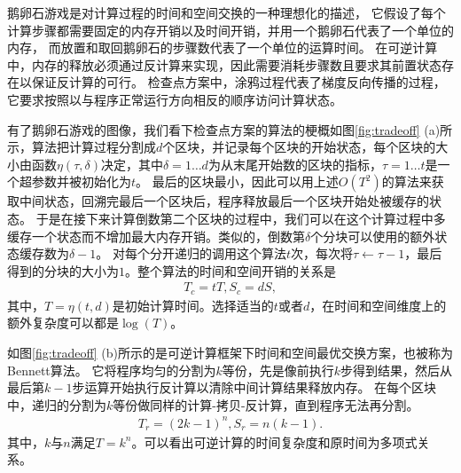 \documentclass[A4,twoside,fontset=ubuntu,UTF8]{ctexart}
\begin{document}
鹅卵石游戏是对计算过程的时间和空间交换的一种理想化的描述，
它假设了每个计算步骤都需要固定的内存开销以及时间开销，并用一个鹅卵石代表了一个单位的内存，
而放置和取回鹅卵石的步骤数代表了一个单位的运算时间。
在可逆计算中，内存的释放必须通过反计算来实现，因此需要消耗步骤数且要求其前置状态存在以保证反计算的可行。
检查点方案中，涂鸦过程代表了梯度反向传播的过程，它要求按照以与程序正常运行方向相反的顺序访问计算状态。

有了鹅卵石游戏的图像，我们看下检查点方案的算法的梗概如图\ref{fig:tradeoff} (a)所示，算法把计算过程分割成$d$个区块，并记录每个区块的开始状态，每个区块的大小由函数$\eta(\tau, \delta)$决定，其中$\delta=1\ldots d$为从末尾开始数的区块的指标，$\tau = 1\ldots t$是一个超参数并被初始化为$t$。
最后的区块最小，因此可以用上述$O(T^2)$的算法来获取中间状态，回溯完最后一个区块后，程序释放最后一个区块开始处被缓存的状态。
于是在接下来计算倒数第二个区块的过程中，我们可以在这个计算过程中多缓存一个状态而不增加最大内存开销。类似的，倒数第$\delta$个分块可以使用的额外状态缓存数为$\delta-1$。
对每个分开递归的调用这个算法$t$次，每次将$\tau\leftarrow \tau-1$，最后得到的分块的大小为$1$。整个算法的时间和空间开销的关系是
\begin{align}
    T_c = tT, S_c = dS,
\end{align}
其中，$T = \eta(t, d)$是初始计算时间。选择适当的$t$或者$d$，在时间和空间维度上的额外复杂度可以都是$\log(T)$。

如图\ref{fig:tradeoff} (b)所示的是可逆计算框架下时间和空间最优交换方案，也被称为Bennett算法。
它将程序均匀的分割为$k$等份，先是像前执行$k$步得到结果，然后从最后第$k-1$步运算开始执行反计算以清除中间计算结果释放内存。
在每个区块中，递归的分割为$k$等份做同样的计算-拷贝-反计算，直到程序无法再分割。
\begin{align}\label{eq:rev}
    T_r = (2k-1)^n, S_r = n(k-1).
\end{align}
其中，$k$与$n$满足$T = k^n$。可以看出可逆计算的时间复杂度和原时间为多项式关系。
\end{document}
